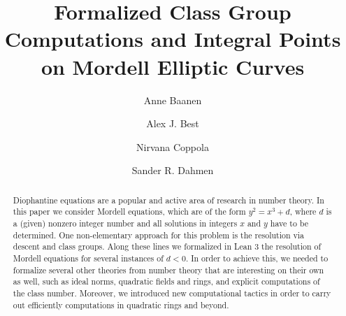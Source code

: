 \documentclass[sigplan,10pt,nonacm,
screen]{acmart} \settopmatter{printfolios=true,printccs=false,printacmref=false}
\begin{document}
\title{Formalized Class Group Computations and Integral Points on Mordell Elliptic Curves}

\author{Anne Baanen}
\author{Alex J. Best}
\author{Nirvana Coppola}
\author{Sander R. Dahmen}


\begin{abstract}
Diophantine equations are a popular and active area of research in number theory.
In this paper we consider Mordell equations, which are of the form $y^2=x^3+d$, where $d$ is a (given) nonzero integer number and all solutions in integers $x$ and $y$ have to be determined.
One non-elementary approach for this problem is the resolution via descent and class groups.
Along these lines we formalized in Lean 3 the resolution of Mordell equations for several instances of $d<0$.
In order to achieve this, we needed to formalize several other theories from number theory that are interesting on their own as well, such as ideal norms, quadratic fields and rings, and explicit computations of the class number. Moreover, we introduced new computational tactics in order to carry out efficiently computations in quadratic rings and beyond.
\end{abstract}
\end{document}
